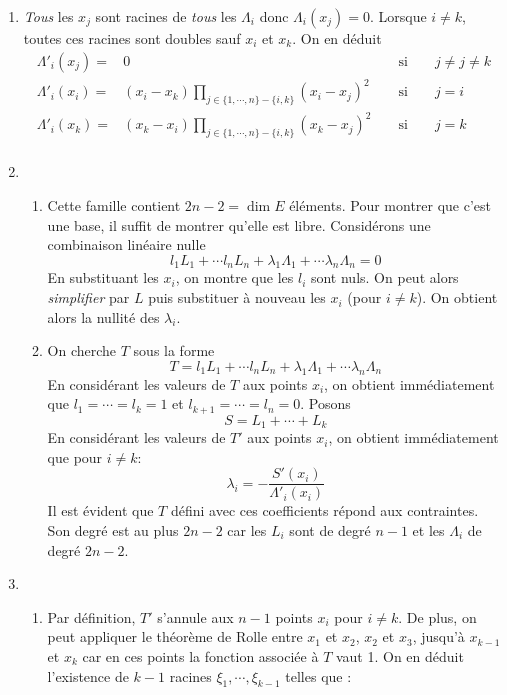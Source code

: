 \begin{enumerate}
\item  \emph{Tous} les $x_j$ sont racines de \emph{tous} les $\Lambda_i$ donc $\Lambda_i(x_j)=0$. Lorsque $i\neq k$, toutes ces racines sont doubles sauf $x_i$ et $x_k$. On en déduit
\begin{align*}
\Lambda'_i(x_j)=& 0 & &\text{ si }& & j\neq j \neq k \\
\Lambda'_i(x_i)=& (x_i-x_k)\prod_{j\in\{1,\cdots,n\}-\{i,k\}}(x_i-x_j)^2 & &\text{ si } & & j=i \\
\Lambda'_i(x_k)=& (x_k-x_i)\prod_{j\in\{1,\cdots,n\}-\{i,k\}}(x_k-x_j)^2 & &\text{ si } & & j=k \\
\end{align*}
\item \begin{enumerate}
\item Cette famille contient $2n-2=\dim E$ éléments. Pour montrer que c'est une base, il suffit de montrer qu'elle est libre.\newline
Considérons une combinaison linéaire nulle
\begin{displaymath}
 l_1L_1+\cdots l_nL_n + \lambda_1 \Lambda_1 + \cdots \lambda_n \Lambda_n = 0
\end{displaymath}
En substituant les $x_i$, on montre que les $l_i$ sont nuls. On peut alors \emph{simplifier} par $L$ puis substituer à nouveau les $x_i$ (pour $i\neq k$). On obtient alors la nullité des $\lambda_i$.
\item On cherche $T$ sous la forme
\[T=l_1L_1+\cdots l_nL_n + \lambda_1 \Lambda_1 + \cdots \lambda_n \Lambda_n\]
En considérant les valeurs de $T$ aux points $x_i$, on obtient immédiatement que
$l_1=\cdots=l_k=1$ et $l_{k+1}=\cdots=l_n=0$. Posons 
\[S=L_1 + \cdots +L_k\]
En considérant les valeurs de $T'$ aux points $x_i$, on obtient immédiatement que
pour $i\neq k$:
\[\lambda_i=-\frac{S'(x_i)}{\Lambda'_i(x_i)}\]
Il est évident que $T$ défini avec ces coefficients répond aux contraintes. Son degré est au plus $2n-2$ car les $L_i$ sont de degré $n-1$ et les $\Lambda_i$ de degré $2n-2$.
\end{enumerate}
\item \begin{enumerate}
\item Par définition, $T'$ s'annule aux $n-1$ points $x_i$ pour $i\neq k$.\newline
De plus, on peut appliquer le théorème de Rolle entre $x_1$ et $x_2$, $x_2$ et $x_3$, jusqu'à $x_{k-1}$ et $x_k$ car en ces points la fonction associée à $T$ vaut 1. On en déduit l'existence de $k-1$ racines $\xi_1,\cdots,\xi_{k-1}$ telles que :

\end{enumerate}
\end{enumerate}
